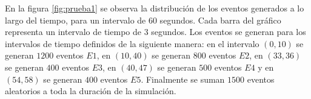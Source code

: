 \documentclass[a4paper,10pt, oneside]{article}
\begin{document}
En la figura \ref{fig:prueba1} se observa la distribución de los eventos generados a lo largo del tiempo, para un intervalo de 60 segundos. Cada barra del gráfico representa un intervalo de tiempo de $3$ segundos.
Los eventos se generan para los intervalos de tiempo definidos de la siguiente manera: en el intervalo $(0,10)$ se generan $1200$ eventos $E1$, en $(10,40)$ se generan $800$ eventos $E2$, en $(33,36)$ se generan $400$ eventos $E3$, en $(40,47)$ se generan $500$ eventos $E4$ y en $(54,58)$ se generan $400$ eventos $E5$. Finalmente se suman $1500$ eventos aleatorios a toda la duración de la simulación. 

\begin{figure}[ht]
	\centering
\end{figure}
\end{document}
